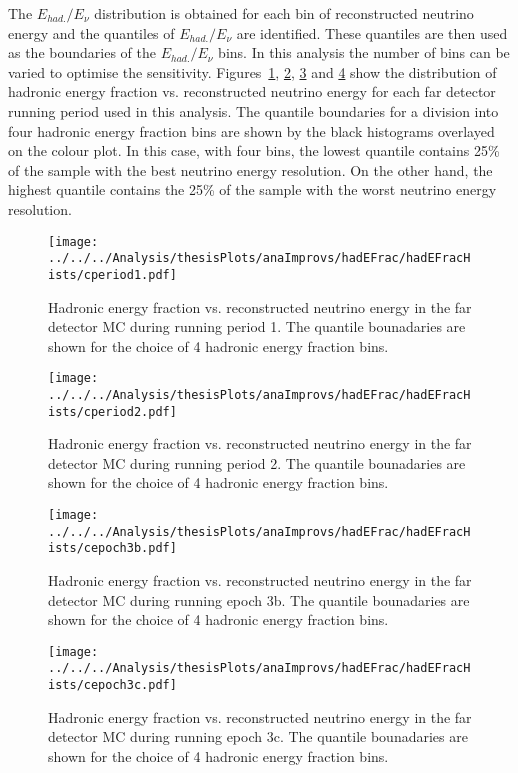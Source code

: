 The $E_{had.} / E_{\nu}$ distribution is obtained for each bin of
reconstructed neutrino energy and the quantiles of $E_{had.} /
E_{\nu}$ are identified. 
These quantiles are then used as the
boundaries of the $E_{had.} / E_\nu$ bins. In this analysis the number
of \hadefrac{} bins can be varied to optimise the sensitivity. 
Figures~\ref{fig:hadEFracHistP1}, \ref{fig:hadEFracHistP2}, \ref{fig:hadEFracHistE3b}
and \ref{fig:hadEFracHistE3c} show the distribution of
hadronic energy fraction vs. reconstructed neutrino energy for each
far detector running period used in this analysis. The quantile
boundaries for a division into four hadronic energy fraction bins are
shown by the black histograms overlayed on the colour plot. 
In this case, with four \hadefrac{} bins, the lowest quantile contains
25\% of the sample with the best neutrino energy resolution. On the
other hand, the highest quantile contains the 25\% of the sample with
the worst neutrino energy resolution.


\begin{figure}
  \centering
  \texttt{[image: ../../../Analysis/thesisPlots/anaImprovs/hadEFrac/hadEFracHists/cperiod1.pdf]}
  \caption{Hadronic energy fraction vs. reconstructed neutrino
    energy in the far detector MC during running period 1. The
    quantile bounadaries are shown for the choice of 4 hadronic energy
    fraction bins. } 
  \label{fig:hadEFracHistP1}
\end{figure}
\begin{figure}
  \centering
  \texttt{[image: ../../../Analysis/thesisPlots/anaImprovs/hadEFrac/hadEFracHists/cperiod2.pdf]}
  \caption{Hadronic energy fraction vs. reconstructed neutrino
    energy in the far detector MC during running period 2. The
    quantile bounadaries are shown for the choice of 4 hadronic energy
    fraction bins. } 
  \label{fig:hadEFracHistP2}
\end{figure}
\begin{figure}
  \centering
  \texttt{[image: ../../../Analysis/thesisPlots/anaImprovs/hadEFrac/hadEFracHists/cepoch3b.pdf]}
  \caption{Hadronic energy fraction vs. reconstructed neutrino
    energy in the far detector MC during running epoch 3b. The
    quantile bounadaries are shown for the choice of 4 hadronic energy
    fraction bins. } 
  \label{fig:hadEFracHistE3b}
\end{figure}
\begin{figure}
  \centering
  \texttt{[image: ../../../Analysis/thesisPlots/anaImprovs/hadEFrac/hadEFracHists/cepoch3c.pdf]}
  \caption{Hadronic energy fraction vs. reconstructed neutrino
    energy in the far detector MC during running epoch 3c. The
    quantile bounadaries are shown for the choice of 4 hadronic energy
    fraction bins. } 
  \label{fig:hadEFracHistE3c}
\end{figure}



